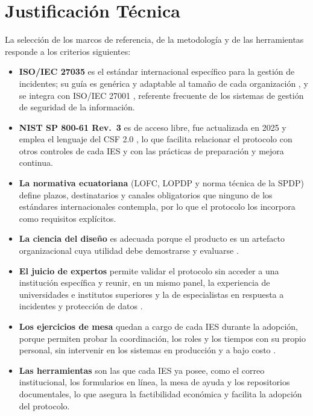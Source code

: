 \section{Justificación Técnica}
La selección de los marcos de referencia, de la metodología y de las herramientas responde a los criterios siguientes:

\begin{itemize}
  \item \textbf{ISO/IEC 27035} es el estándar internacional específico para la gestión de incidentes; su guía es genérica y adaptable al tamaño de cada organización \cite{iso27035_2023}, y se integra con ISO/IEC 27001 \cite{iso27001_2022}, referente frecuente de los sistemas de gestión de seguridad de la información.
  \item \textbf{NIST SP 800-61 Rev.~3} es de acceso libre, fue actualizada en 2025 y emplea el lenguaje del CSF 2.0 \cite{nist80061r3,nistcsf2024}, lo que facilita relacionar el protocolo con otros controles de cada IES y con las prácticas de preparación y mejora continua.
  \item \textbf{La normativa ecuatoriana} (LOFC, LOPDP y norma técnica de la SPDP) define plazos, destinatarios y canales obligatorios que ninguno de los estándares internacionales contempla, por lo que el protocolo los incorpora como requisitos explícitos.
  \item \textbf{La ciencia del diseño} es adecuada porque el producto es un artefacto organizacional cuya utilidad debe demostrarse y evaluarse \cite{hevner2004design,peffers2007dsrm}.
  \item \textbf{El juicio de expertos} permite validar el protocolo sin acceder a una institución específica y reunir, en un mismo panel, la experiencia de universidades e institutos superiores y la de especialistas en respuesta a incidentes y protección de datos \cite{aiken1985}.
  \item \textbf{Los ejercicios de mesa} quedan a cargo de cada IES durante la adopción, porque permiten probar la coordinación, los roles y los tiempos con su propio personal, sin intervenir en los sistemas en producción y a bajo costo \cite{nist80084,angafor2023scenario}.
  \item \textbf{Las herramientas} son las que cada IES ya posee, como el correo institucional, los formularios en línea, la mesa de ayuda y los repositorios documentales, lo que asegura la factibilidad económica y facilita la adopción del protocolo.
\end{itemize}
